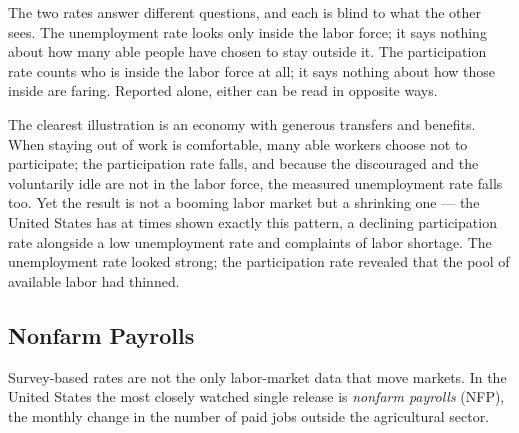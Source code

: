 
The two rates answer different questions, and each is blind to what the other sees. The unemployment rate looks only inside the labor force; it says nothing about how many able people have chosen to stay outside it. The participation rate counts who is inside the labor force at all; it says nothing about how those inside are faring. Reported alone, either can be read in opposite ways.


The clearest illustration is an economy with generous transfers and benefits. When staying out of work is comfortable, many able workers choose not to participate; the participation rate falls, and because the discouraged and the voluntarily idle are not in the labor force, the measured unemployment rate falls too. Yet the result is not a booming labor market but a shrinking one --- the United States has at times shown exactly this pattern, a declining participation rate alongside a low unemployment rate and complaints of labor shortage. The unemployment rate looked strong; the participation rate revealed that the pool of available labor had thinned.

\subsection{Nonfarm Payrolls}

Survey-based rates are not the only labor-market data that move markets. In the United States the most closely watched single release is \emph{nonfarm payrolls} (NFP), the monthly change in the number of paid jobs outside the agricultural sector.


